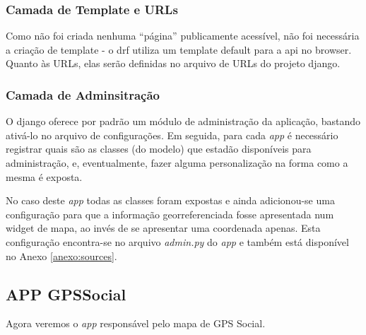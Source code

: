 \subsubsection{Camada de Template e URLs}
Como não foi criada nenhuma ``página'' publicamente acessível, não foi necessária a criação de template - o \gls{drf} utiliza um template default para a \gls{api} no browser. Quanto às URLs, elas serão definidas no arquivo de URLs do projeto \gls{django}.

\subsubsection{Camada de Adminsitração}
O \gls{django} oferece por padrão um módulo de administração da aplicação, bastando ativá-lo no arquivo de configurações. Em seguida, para cada \textit{app} é necessário registrar quais são as classes (do modelo) que estadão disponíveis para administração, e, eventualmente, fazer alguma personalização na forma como a mesma é exposta.

No caso deste \textit{app} todas as classes foram expostas e ainda adicionou-se uma configuração para que a informação georreferenciada fosse apresentada num widget de mapa, ao invés de se apresentar uma coordenada apenas. Esta configuração encontra-se no arquivo \textit{admin.py} do \textit{app} e também está disponível no Anexo \ref{anexo:sources}.

\clearpage
\subsection{APP GPSSocial}
Agora veremos o \textit{app} responsável pelo mapa de GPS Social.


